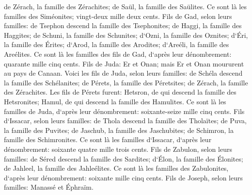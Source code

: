 \verse de Zérach, la famille des Zérachites; de Saül, la famille des Saülites. 
\verse Ce sont là les familles des Siméonites; vingt-deux mille deux cents. 
\verse Fils de Gad, selon leurs familles: de Tsephon descend la famille des Tsephonites; de Haggi, la famille des Haggites; de Schuni, la famille des Schunites; 
\verse d`Ozni, la famille des Oznites; d`Éri, la famille des Érites; 
\verse d`Arod, la famille des Arodites; d`Areéli, la famille des Areélites. 
\verse Ce sont là les familles des fils de Gad, d`après leur dénombrement: quarante mille cinq cents. 
\verse Fils de Juda: Er et Onan; mais Er et Onan moururent au pays de Canaan. 
\verse Voici les fils de Juda, selon leurs familles: de Schéla descend la famille des Schélanites; de Pérets, la famille des Péretsites; de Zérach, la famille des Zérachites. 
\verse Les fils de Pérets furent: Hetsron, de qui descend la famille des Hetsronites; Hamul, de qui descend la famille des Hamulites. 
\verse Ce sont là les familles de Juda, d`après leur dénombrement: soixante-seize mille cinq cents. 
\verse Fils d`Issacar, selon leurs familles: de Thola descend la famille des Tholaïtes; de Puva, la famille des Puvites; 
\verse de Jaschub, la famille des Jaschubites; de Schimron, la famille des Schimronites. 
\verse Ce sont là les familles d`Issacar, d`après leur dénombrement: soixante quatre mille trois cents. 
\verse Fils de Zabulon, selon leurs familles: de Séred descend la famille des Sardites; d`Élon, la famille des Élonites; de Jahleel, la famille des Jahleélites. 
\verse Ce sont là les familles des Zabulonites, d`après leur dénombrement: soixante mille cinq cents. 
\verse Fils de Joseph, selon leurs familles: Manassé et Éphraïm. 
